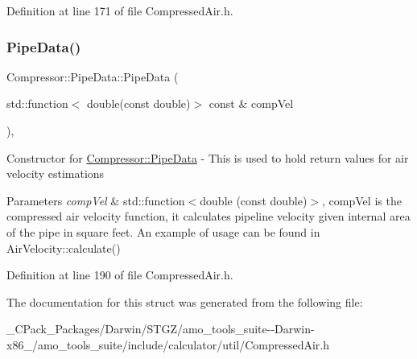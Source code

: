 Definition at line 171 of file Compressed\+Air.\+h.

\mbox{\label{struct_compressor_1_1_pipe_data_af7998fd533340b0a84e78fcda91b4806}} 
\subsubsection{\texorpdfstring{Pipe\+Data()}{PipeData()}\hspace{0.1cm}{\footnotesize\ttfamily [6/6]}}
{\footnotesize\ttfamily Compressor\+::\+Pipe\+Data\+::\+Pipe\+Data (\begin{DoxyParamCaption}\item[{std\+::function$<$ double(const double)$>$ const \&}]{comp\+Vel }\end{DoxyParamCaption})\hspace{0.3cm}{\ttfamily [inline]}, {\ttfamily [explicit]}}

Constructor for \hyperlink{struct_compressor_1_1_pipe_data}{Compressor\+::\+Pipe\+Data} -\/ This is used to hold return values for air velocity estimations 
\begin{DoxyParams}{Parameters}
{\em comp\+Vel} & std\+::function$<$double (const double)$>$, comp\+Vel is the compressed air velocity function, it calculates pipeline velocity given internal area of the pipe in square feet. An example of usage can be found in Air\+Velocity\+::calculate() \\
\hline
\end{DoxyParams}


Definition at line 190 of file Compressed\+Air.\+h.



The documentation for this struct was generated from the following file\+:\begin{DoxyCompactItemize}
\item 
\+\_\+\+C\+Pack\+\_\+\+Packages/\+Darwin/\+S\+T\+G\+Z/amo\+\_\+tools\+\_\+suite-\/-\/\+Darwin-\/x86\+\_/amo\+\_\+tools\+\_\+suite/include/calculator/util/Compressed\+Air.\+h\end{DoxyCompactItemize}
